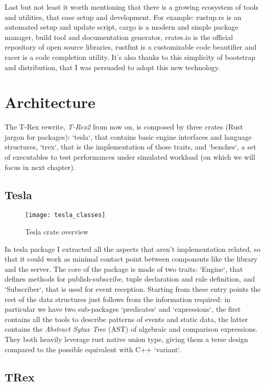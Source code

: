 Last but not least it worth mentioning that there is a growing ecosystem of tools and utilities, that ease setup and development. For example: rustup.rs is an automated setup and update script, cargo is a modern and simple package manager, build tool and documentation generator, crates.io is the official repository of open source libraries, rustfmt is a customizable code beautifier and racer is a code completion utility. It's also thanks to this simplicity of bootstrap and distribution, that I was persuaded to adopt this new technology.

\section{Architecture}
The T-Rex rewrite, \emph{T-Rex2} from now on, is composed by three crates (Rust jargon for packages): `tesla`, that contains basic engine interfaces and language structures, `trex`, that is the implementation of those traits, and `benches`, a set of executables to test performances under simulated workload (on which we will focus in next chapter).

\subsection{Tesla}

\begin{figure}[h]
  \centering
  \texttt{[image: tesla\_classes]}
  \caption{Tesla crate overview}
\end{figure}

In tesla package I extracted all the aspects that aren't implementation related, so that it could work as minimal contact point between components like the library and the server. The core of the package is made of two traits: `Engine`, that defines methods for publish-subscribe, tuple declaration and rule definition, and `Subscriber`, that is used for event reception. Starting from these entry points the rest of the data structures just follows from the information required: in particular we have two sub-packages `predicates` and `expressions`, the first contains all the tools to describe patterns of events and static data, the latter contains the \emph{Abstract Sytax Tree} (AST) of algebraic and comparison expressions. They both heavily leverage rust native union type, giving them a terse design compared to the possible equivalent with C++ `variant`.

\subsection{TRex}

